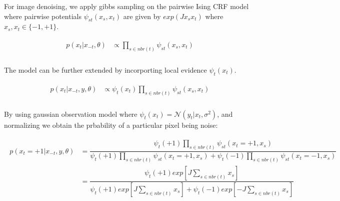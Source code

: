 \documentclass[paper=a4, fontsize=11pt]{scrartcl} %
\begin{document}
For image denoising, we apply gibbs sampling on the pairwise Ising CRF model where pairwise potentials $\psi_{st}(x_s,x_t)$ are given by $exp(Jx_sx_t)$ where $ x_s,x_t \in \{-1,+1\}$.


\begin{align} 
\begin{split}
p(x_t|x_{-t},\theta) & \propto \prod_{s\in nbr(t)} \psi_{st}(x_s,x_t)\\
\end{split}					
\end{align} 

The model can be further extended by incorporting local evidence $\psi_t(x_t)$. 

\begin{align} 
\begin{split}
	p(x_t|x_{-t},y,\theta) & \propto \psi_t(x_t) \prod_{s\in nbr(t)} \psi_{st}(x_s,x_t)\\
\end{split}						
\end{align} 

By using gaussian observation model where $\psi_t(x_t) = \mathcal{N}(y_t|x_t,\sigma^2)$, and normalizing we obtain the prbability of a particular pixel being noise:


\begin{align} 
\begin{split}
p(x_t=+1|x_{-t},y,\theta) & = \dfrac{\psi_t(+1) \prod_{s\in nbr(t)} \psi_{st}(x_t=+1,x_s)}{\psi_t(+1) \prod_{s\in nbr(t)} \psi_{st}(x_t=+1,x_s) + \psi_t(-1)\prod_{s\in nbr(t)} \psi_{st}(x_t=-1,x_s)}\\
& = \dfrac{\psi_t(+1) exp[J\sum_{s\in nbr(t)}{x_s}]}{\psi_t(+1) exp[J\sum_{s\in nbr(t)}{x_s}]+\psi_t(-1) exp[-J\sum_{s\in nbr(t)}{x_s}]}\\
\end{split}						
\end{align} 







 

\end{document}
